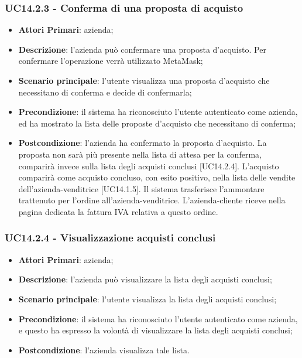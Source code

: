 \subsubsection{UC14.2.3 - Conferma di una proposta di acquisto}
\begin{itemize}
	\item \textbf{Attori Primari}: azienda;
	\item \textbf{Descrizione}: l'azienda può confermare una proposta d'acquisto. Per confermare l'operazione verrà utilizzato MetaMask\glo;
	\item \textbf{Scenario principale}: l'utente visualizza una proposta d'acquisto che necessitano di conferma e decide di confermarla;
	\item \textbf{Precondizione}: il sistema ha riconosciuto l'utente autenticato come azienda, ed ha mostrato la lista delle proposte d'acquisto che necessitano di conferma;
	\item \textbf{Postcondizione}: l'azienda ha confermato la proposta d'acquisto. La proposta non sarà più presente nella lista di attesa per la conferma, comparirà invece sulla lista degli acquisti conclusi [UC14.2.4]. L'acquisto comparirà come acquisto concluso, con esito positivo, nella lista delle vendite dell'azienda-venditrice [UC14.1.5]. Il sistema trasferisce l'ammontare trattenuto per l'ordine all'azienda-venditrice. L'azienda-cliente riceve nella pagina dedicata la fattura IVA relativa a questo ordine.
\end{itemize}
\subsubsection{UC14.2.4 - Visualizzazione acquisti conclusi}
\begin{itemize}
	\item \textbf{Attori Primari}: azienda;
	\item \textbf{Descrizione}: l'azienda può visualizzare la lista degli acquisti conclusi;
	\item \textbf{Scenario principale}: l'utente visualizza la lista degli acquisti conclusi;
	\item \textbf{Precondizione}: il sistema ha riconosciuto l'utente autenticato come azienda, e questo ha espresso la volontà di visualizzare la lista degli acquisti conclusi;
	\item \textbf{Postcondizione}: l'azienda visualizza tale lista.
\end{itemize}
